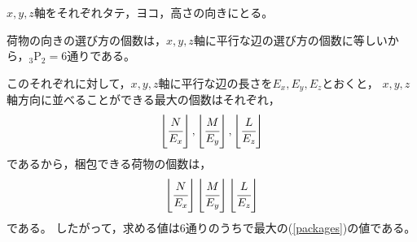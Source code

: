 \documentclass{article}
\begin{document}
$x, y, z$軸をそれぞれタテ，ヨコ，高さの向きにとる。

荷物の向きの選び方の個数は，$x, y, z$軸に平行な辺の選び方の個数に等しいから，${}_3 \mathrm{P}_2 = 6$通りである。

このそれぞれに対して，$x, y, z$軸に平行な辺の長さを$E_x, E_y, E_z$とおくと，
$x, y, z$軸方向に並べることができる最大の個数はそれぞれ，
\[
    \left\lfloor \cfrac{N}{E_x} \right\rfloor,
    \left\lfloor \cfrac{M}{E_y} \right\rfloor,
    \left\lfloor \cfrac{L}{E_z} \right\rfloor
\]
であるから，梱包できる荷物の個数は，
\begin{equation}
    \label{packages}
    \left\lfloor \cfrac{N}{E_x} \right\rfloor
    \left\lfloor \cfrac{M}{E_y} \right\rfloor
    \left\lfloor \cfrac{L}{E_z} \right\rfloor
\end{equation}
である。
したがって，求める値は6通りのうちで最大の(\ref{packages})の値である。
\end{document}
